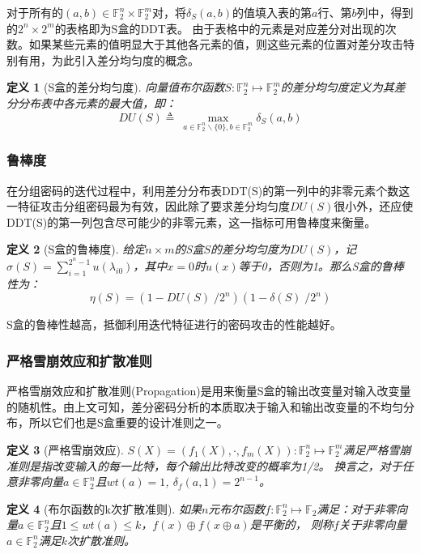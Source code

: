 \documentclass{xduugthesis}
\newtheorem{definition}{定义}
\begin{document}
对于所有的$(a,b)\in \mathbb{F}_2^n \times \mathbb{F}_2^m$对，将$\delta_S(a,b)$的值填入表的第$a$行、第$b$列中，得到的$2^n \times 2^m$的表格即为S盒的DDT表。
由于表格中的元素是对应差分对出现的次数。如果某些元素的值明显大于其他各元素的值，则这些元素的位置对差分攻击特别有用，为此引入差分均匀度的概念。

\begin{definition}[S盒的差分均匀度]
    向量值布尔函数$S:\mathbb{F}_2^n \mapsto \mathbb{F}_2^m$的差分均匀度定义为其差分分布表中各元素的最大值，即：
    \begin{equation}
        DU(S) \triangleq \: \mathop{max}\limits_{a \in \mathbb{F}_2^n \backslash \{0\}, b\in \mathbb{F}_2^m } \delta_S(a,b)
    \end{equation}
\end{definition}

\subsubsection{鲁棒度}
在分组密码的迭代过程中，利用差分分布表DDT(S)的第一列中的非零元素个数这一特征攻击分组密码最为有效，因此除了要求差分均匀度$DU(S)$很小外，还应使DDT(S)的第一列包含尽可能少的非零元素，这一指标可用鲁棒度\cite{刘景伟2004aes}来衡量。
\begin{definition}[S盒的鲁棒度]
    给定$n \times m$的S盒$S$的差分均匀度为$DU(S)$，记$\sigma(S) =\mathop{\sum}\limits_{i=1}^{2^n-1}u(\lambda_{i0})$，其中$x=0$时$u(x)$等于0，否则为1。那么S盒的鲁棒性为：
\begin{equation}
    \eta(S) = (1-DU(S) \;/2^n)(1-\delta(S)\;/2^n)
\end{equation}\par
\end{definition}\par
S盒的鲁棒性越高，抵御利用迭代特征进行的密码攻击的性能越好。\par

\subsubsection{严格雪崩效应和扩散准则}
严格雪崩效应和扩散准则(Propagation)是用来衡量S盒的输出改变量对输入改变量的随机性。由上文可知，差分密码分析的本质取决于输入和输出改变量的不均匀分布，所以它们也是S盒重要的设计准则之一。\par
\begin{definition}[严格雪崩效应]
    $S(X)=(f_1 (X),\cdot,f_m (X)):\mathbb{F}_2^n \mapsto \mathbb{F}_2^m$满足严格雪崩准则是指改变输入的每一比特，每个输出比特改变的概率为1/2。
    换言之，对于任意非零向量$a\in \mathbb{F}_2^n$且$wt(a)=1$, $\delta_f(a,1) =2^{n-1}$。
\end{definition}
\begin{definition}[布尔函数的k次扩散准则]
    如果$n$元布尔函数$f:\mathbb{F}_2^n \mapsto \mathbb{F}_2$满足：对于非零向量$a \in \mathbb{F}_2^n$且$1\leq wt(a)\leq k$，$f(x)\oplus f(x\oplus a)$是平衡的，
    则称$f$关于非零向量$a \in \mathbb{F}_2^n$满足$k$次扩散准则。
\end{definition}
\end{document}
